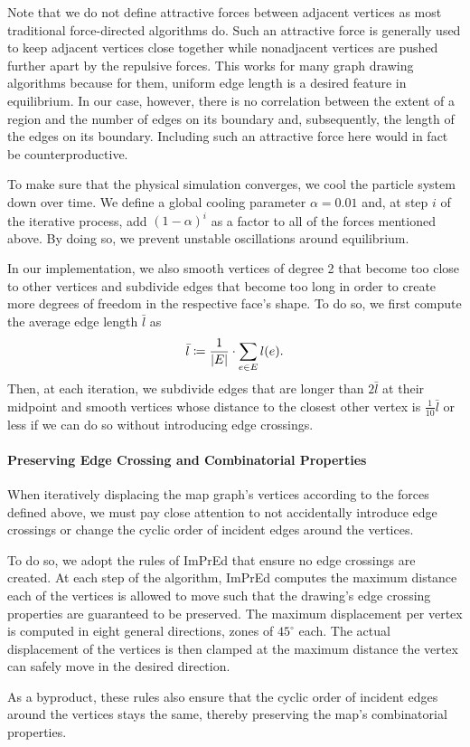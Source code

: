 Note that we do not define attractive forces between adjacent vertices as most traditional force-directed algorithms do.
Such an attractive force is generally used to keep adjacent vertices close together while nonadjacent vertices are pushed further apart by the repulsive forces.
This works for many graph drawing algorithms because for them, uniform edge length is a desired feature in equilibrium.
In our case, however, there is no correlation between the extent of a region and the number of edges on its boundary and, subsequently, the length of the edges on its boundary.
Including such an attractive force here would in fact be counterproductive.

To make sure that the physical simulation converges, we cool the particle system down over time.
We define a global cooling parameter $\alpha = 0.01$ and, at step $i$ of the iterative process, add $(1 - \alpha)^i$ as a factor to all of the forces mentioned above.
By doing so, we prevent unstable oscillations around equilibrium.

In our implementation, we also smooth vertices of degree 2 that become too close to other vertices and subdivide edges that become too long in order to create more degrees of freedom in the respective face's shape.
To do so, we first compute the average edge length $\bar{l}$ as
%
\begin{equation*}
	\bar{l} \coloneqq \frac1{\left\lvert E\right\rvert} \cdot \sum\limits_{e \in E} l(e)
	.
\end{equation*}
%
Then, at each iteration, we subdivide edges that are longer than $2\bar{l}$ at their midpoint and smooth vertices whose distance to the closest other vertex is $\frac{1}{10}\bar{l}$ or less if we can do so without introducing edge crossings.



\paragraph{Preserving Edge Crossing and Combinatorial Properties}

When iteratively displacing the map graph's vertices according to the forces defined above, we must pay close attention to not accidentally introduce edge crossings or change the cyclic order of incident edges around the vertices.

To do so, we adopt the rules of ImPrEd \cite{simonetto2011impred} that ensure no edge crossings are created.
At each step of the algorithm, ImPrEd computes the maximum distance each of the vertices is allowed to move such that the drawing's edge crossing properties are guaranteed to be preserved.
The maximum displacement per vertex is computed in eight general directions, zones of $45^\circ$ each.
The actual displacement of the vertices is then clamped at the maximum distance the vertex can safely move in the desired direction.

As a byproduct, these rules also ensure that the cyclic order of incident edges around the vertices stays the same, thereby preserving the map's combinatorial properties.
